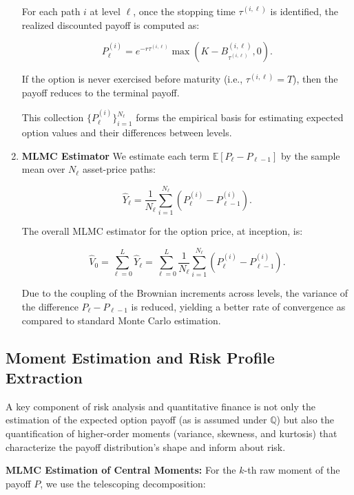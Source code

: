 \documentclass[titlepage]{article}
\begin{document}
\begin{enumerate}
    For each path \(i\) at level \(\ell\), once the stopping time \(\tau^{(i, \ell)}\) is identified, the realized discounted payoff is computed as:

    \[
    P_\ell^{(i)} = e^{-r \tau^{(i, \ell)}} \max\left( K - B_{\tau^{(i, \ell)}}^{(i, \ell)}, 0 \right).
    \]

    If the option is never exercised before maturity (i.e., \(\tau^{(i, \ell)} = T\)), then the payoff reduces to the terminal payoff.

    This collection \(\{P_\ell^{(i)}\}_{i=1}^{N_\ell}\) forms the empirical basis for estimating expected option values and their differences between levels.

    \item \textbf{MLMC Estimator}
    We estimate each term \(\mathbb{E}[P_\ell - P_{\ell-1}]\) by the sample mean over \(N_\ell\) asset-price paths:

    \[
    \widehat{Y}_\ell = \frac{1}{N_\ell} \sum_{i=1}^{N_\ell} \left( P_\ell^{(i)} - P_{\ell-1}^{(i)} \right).
    \]

    The overall MLMC estimator for the option price, at inception, is:

    \[
    \hat{V}_0 = \sum_{\ell=0}^L \widehat{Y}_\ell = \sum_{\ell=0}^L \frac{1}{N_\ell} \sum_{i=1}^{N_\ell} \left( P_\ell^{(i)} - P_{\ell-1}^{(i)} \right).
    \]

    Due to the coupling of the Brownian increments across levels, the variance of the difference \(P_\ell - P_{\ell-1}\) is reduced, yielding a better rate of convergence as compared to standard Monte Carlo estimation.

\end{enumerate}

\subsection{Moment Estimation and Risk Profile Extraction}

A key component of risk analysis and quantitative finance is not only the estimation of the expected option payoff (as is assumed under $\mathbb{Q}$) but also the quantification of higher-order moments (variance, skewness, and kurtosis) that characterize the payoff distribution's shape and inform about risk.

\vspace{6pt}
\noindent \textbf{MLMC Estimation of Central Moments:}  
For the \(k\)-th raw moment of the payoff \(P\), we use the telescoping decomposition:
\end{document}
